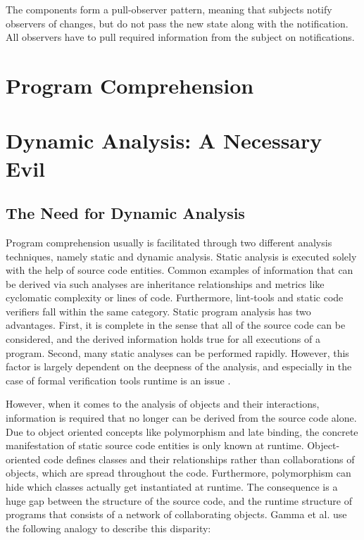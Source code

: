 The components form a pull-observer pattern, meaning that subjects notify observers of changes, but do not pass the new state along with the notification.
All observers have to pull required information from the subject on notifications.

\section{Program Comprehension}

\section{Dynamic Analysis: A Necessary Evil}
\label{s:BackgroundAnalysis}

\subsection{The Need for Dynamic Analysis}
\label{ss:BackgroundAnalysisNeccessity}
Program comprehension usually is facilitated through two different analysis techniques, namely static and dynamic analysis.
Static analysis is executed solely with the help of source code entities.
Common examples of information that can be derived via such analyses are inheritance relationships and metrics like cyclomatic complexity or lines of code.
Furthermore, lint-tools and static code verifiers fall within the same category.
Static program analysis has two advantages.
First, it is complete in the sense that all of the source code can be considered, and the derived information holds true for all executions of a program.
Second, many static analyses can be performed rapidly.
However, this factor is largely dependent on the deepness of the analysis, and especially in the case of formal verification tools runtime is an issue \cite{wichmann_industrial_1995}.

However, when it comes to the analysis of objects and their interactions, information is required that no longer can be derived from the source code alone.
Due to object oriented concepts like polymorphism and late binding, the concrete manifestation of static source code entities is only known at runtime.
Object-oriented code defines classes and their relationships rather than collaborations of objects, which are spread throughout the code.
Furthermore, polymorphism can hide which classes actually get instantiated at runtime.
The consequence is a huge gap between the structure of the source code, and the runtime structure of programs that consists of a network of collaborating objects.
Gamma et al. use the following analogy to describe this disparity:

